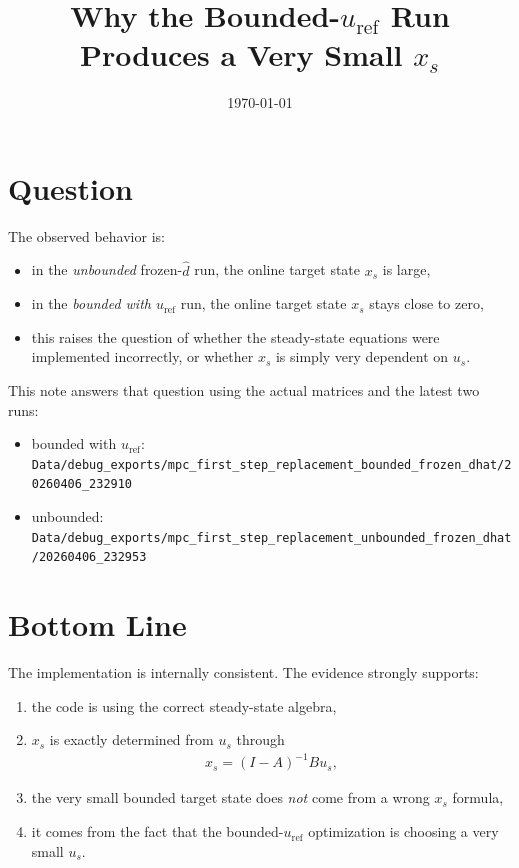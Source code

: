 \documentclass[11pt]{article}
\title{Why the Bounded-\texorpdfstring{$u_{\mathrm{ref}}$}{u\_ref} Run Produces a Very Small \texorpdfstring{$x_s$}{x\_s}}
\author{}
\date{\today}
\begin{document}
\maketitle

\section{Question}

The observed behavior is:
\begin{itemize}
\item in the \emph{unbounded} frozen-$\hat d$ run, the online target state $x_s$ is large,
\item in the \emph{bounded with $u_{\mathrm{ref}}$} run, the online target state $x_s$ stays close to zero,
\item this raises the question of whether the steady-state equations were implemented incorrectly, or whether $x_s$ is simply very dependent on $u_s$.
\end{itemize}

This note answers that question using the actual matrices and the latest two runs:
\begin{itemize}
\item bounded with $u_{\mathrm{ref}}$: \texttt{Data/debug\_exports/mpc\_first\_step\_replacement\_bounded\_frozen\_dhat/20260406\_232910}
\item unbounded: \texttt{Data/debug\_exports/mpc\_first\_step\_replacement\_unbounded\_frozen\_dhat/20260406\_232953}
\end{itemize}

\section{Bottom Line}

The implementation is internally consistent. The evidence strongly supports:
\begin{enumerate}
\item the code is using the correct steady-state algebra,
\item $x_s$ is exactly determined from $u_s$ through
\begin{align}
x_s = (I-A)^{-1}Bu_s,
\end{align}
\item the very small bounded target state does \emph{not} come from a wrong $x_s$ formula,
\item it comes from the fact that the bounded-\(u_{\mathrm{ref}}\) optimization is choosing a very small $u_s$.
\end{enumerate}
\end{document}

